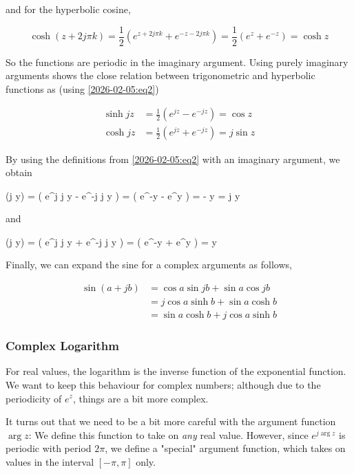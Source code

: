 and for the hyperbolic cosine,

\begin{equation*}
    \cosh (z + 2j\pi k) = \frac{1}{2} \left( e^{z + 2j\pi k} + e^{- z - 2j\pi k} \right) = \frac{1}{2} \left( e^{z} + e^{- z} \right) = \cosh z
\end{equation*}

So the functions are periodic in the imaginary argument. Using purely imaginary arguments shows the close relation between trigonometric and hyperbolic functions as (using \eqref{2026-02-05:eq2})

\begin{align*}
    \sinh jz &= \frac{1}{2} \left( e^{jz} - e^{-jz} \right) = \cos z \\
    \cosh jz &= \frac{1}{2} \left( e^{jz} + e^{-jz} \right) = j \sin z
\end{align*}


By using the definitions from \eqref{2026-02-05:eq2} with an imaginary argument, we obtain

\bee
\sin (j y) =  \left( e^{j \cdot j y} - e^{-j \cdot j y} \right) =  \left( e^{-y} - e^{y} \right) = -  \sinh y = j \sinh y
\eee

and

\bee
\cos (j y) =  \left( e^{j \cdot j y} + e^{-j \cdot j y} \right) =  \left( e^{-y} + e^{y} \right) = \cosh y
\eee

Finally, we can expand the sine for a complex arguments as follows,

\begin{align*}
    \sin(a + jb) &= \cos a \sin jb + \sin a \cos jb \\
    &= j \cos a \sinh b + \sin a \cosh b \\
    &= \sin a \cosh b + j \cos a \sinh b
\end{align*}



\subsubsection{Complex Logarithm}

For real values, the logarithm is the inverse function of the exponential function. We want to keep this behaviour for complex numbers; although due to the periodicity of $e^z$, things are a bit more complex.

It turns out that we need to be a bit more careful with the argument function $\arg z$: We define this function to take on \emph{any} real value. However, since $e^{j \arg z}$ is periodic with period $2 \pi$, we define a "special" argument function, which takes on values in the interval $[-\pi, \pi]$ only.

